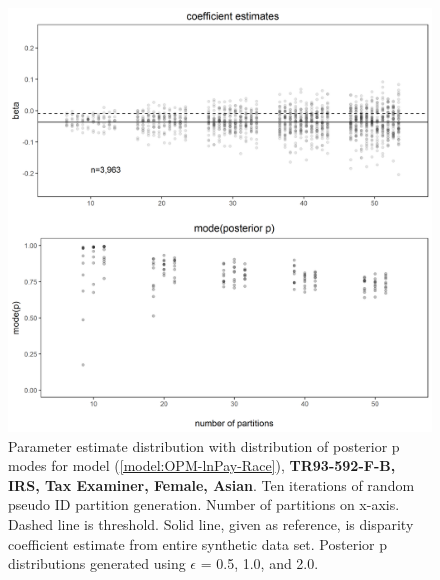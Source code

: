 \documentclass[10pt, letterpaper]{article}
\begin{document}
\begin{spacing}{1.0}
\begin{figure}[h!]
    \centering
    \includegraphics[width=5in]{images/RacePayDifferentialBetaWithPosteriorDistribution-TR93-592-F-B.png}
    \caption{Parameter estimate distribution with distribution of posterior p modes for model (\ref{model:OPM-lnPay-Race}), \textbf{TR93-592-F-B, IRS, Tax Examiner, Female, Asian}.  Ten iterations of random pseudo ID partition generation.  Number of partitions on x-axis.  Dashed line is threshold.  Solid line, given as reference, is disparity coefficient estimate from entire synthetic data set.  Posterior p distributions generated using $\epsilon$ = 0.5, 1.0, and 2.0.}
    \label{figure:RacePayDifferentialBetaWithPosteriorDistribution-TR93-592-F-B}
\end{figure}

\clearpage


\end{spacing}
\end{document}
